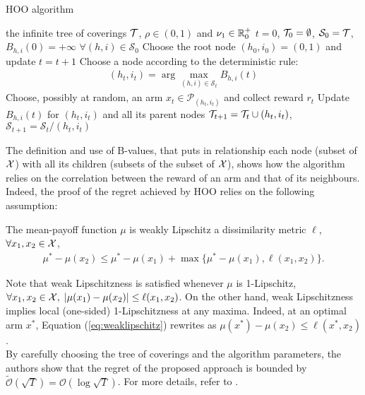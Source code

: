 \begin{algorithm}[t]
	\caption{\gls{HOO} algorithm}
	\label{alg:hoo}
	\begin{algorithmic}[1]
	 the infinite tree of coverings $\mathcal{T}$, $\rho\in(0,1)$ and $\nu_1\in\mathbb{R}^+_0$
	 $t=0$, $\mathcal{T}_0=\emptyset$, $\mathcal{S}_0=\mathcal{T}$, $B_{h,i}(0)=+\infty$ $\forall (h,i)\in\mathcal{S}_0$
	\State Choose the root node $(h_0, i_0)=(0,1)$ and update $t = t+1$
		\State Choose a node according to the deterministic rule:
		\begin{align}
		(h_t, i_t) = \arg\max_{(h, i)\in\mathcal{S}_t}B_{h,i}(t)
		\end{align}
		\State Choose, possibly at random, an arm $x_t\in\mathcal{P}_{(h_t, i_t)}$ and collect reward $r_t$
		\State Update $B_{h,i}(t)$ for $(h_t,i_t)$ and all its parent nodes
		\State $\mathcal{T}_{t+1}=\mathcal{T}_t\cup(h_t,i_t)$, $\mathcal{S}_{t+1}=\mathcal{S}_t/(h_t,i_t)$
	\EndFor
	\end{algorithmic}
\end{algorithm}

The definition and use of B-values, that puts in relationship each node (subset of $\mathcal{X}$) with all its children (subsets of the subset of $\mathcal{X}$), shows how the algorithm relies on the correlation between the reward of an arm and that of its neighbours. Indeed, the proof of the regret achieved by \gls{HOO} relies on the following assumption:

\begin{assumption}
The mean-payoff function $\mu$ is weakly Lipschitz \wrt a dissimilarity metric $\ell$, \ie $\forall x_1,x_2\in\mathcal{X}$,
\begin{align}
\mu^*-\mu(x_2)\leq\mu^* - \mu(x_1)+\max\{\mu^* - \mu(x_1), \ell(x_1,x_2)\}. \label{eq:weaklipschitz}
\end{align}
\end{assumption}

Note that weak Lipschitzness is satisfied whenever $\mu$ is 1-Lipschitz, \ie $\forall x_1,x_2\in\mathcal{X}, \; |\mu(x_1)-\mu(x_2)|\leq\ell(x_1,x_2)$. On the other hand, weak Lipschitzness implies local (one-sided) 1-Lipschitzness at any maxima. Indeed, at an optimal arm $x^*$, Equation (\ref{eq:weaklipschitz}) rewrites as $\mu(x^*)-\mu(x_2)\leq\ell(x^*,x_2)$. \\
By carefully choosing the tree of coverings and the algorithm parameters, the authors show that the regret of the proposed approach is bounded by $\widetilde{\mathcal{O}}(\sqrt{T}) = \mathcal{O}(\log\sqrt{T})$. For more details, refer to \cite{bubeck2011x}.


